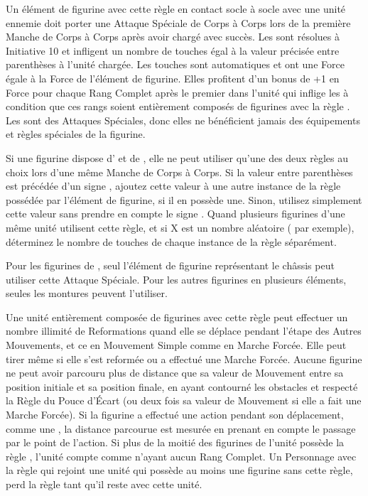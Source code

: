 \newpage
{}

Un élément de figurine avec cette règle en contact socle à socle avec une unité ennemie doit porter une Attaque Spéciale de Corps à Corps lors de la première Manche de Corps à Corps après avoir chargé avec succès. Les \impacthits{} sont résolues à Initiative 10 et infligent un nombre de touches égal à la valeur précisée entre parenthèses à l'unité chargée. Les touches sont automatiques et ont une Force égale à la Force de l'élément de figurine. Elles profitent d'un bonus de +1 en Force pour chaque Rang Complet après le premier dans l'unité qui inflige les \impacthits{} à condition que ces rangs soient entièrement composés de figurines avec la règle \impacthits{}. Les \impacthits{} sont des Attaques Spéciales, donc elles ne bénéficient jamais des équipements et règles spéciales de la figurine.

Si une figurine dispose d'\grindingattacks{} et de \impacthits{}, elle ne peut utiliser qu'une des deux règles au choix lors d'une même Manche de Corps à Corps. Si la valeur entre parenthèses est précédée d'un signe \result{+}, ajoutez cette valeur à une autre instance de la règle \impacthits{} possédée par l'élément de figurine, si il en possède une. Sinon, utilisez simplement cette valeur sans prendre en compte le signe \result{+}. Quand plusieurs figurines d'une même unité utilisent cette règle, et si X est un nombre aléatoire ( par exemple), déterminez le nombre de touches de chaque instance de la règle séparément.

Pour les figurines de \chariot{}, seul l'élément de figurine représentant le châssis peut utiliser cette Attaque Spéciale. Pour les autres figurines en plusieurs éléments, seules les montures peuvent l'utiliser.


Une unité entièrement composée de figurines avec cette règle peut effectuer un nombre illimité de Reformations quand elle se déplace pendant l'étape des Autres Mouvements, et ce en Mouvement Simple comme en Marche Forcée. Elle peut tirer même si elle s'est reformée ou a effectué une Marche Forcée. Aucune figurine ne peut avoir parcouru plus de distance que sa valeur de Mouvement entre sa position initiale et sa position finale, en ayant contourné les obstacles et respecté la Règle du Pouce d'Écart (ou deux fois sa valeur de Mouvement si elle a fait une Marche Forcée). Si la figurine a effectué une action pendant son déplacement, comme une \sweepingattack{}, la distance parcourue est mesurée en prenant en compte le passage par le point de l'action. Si plus de la moitié des figurines de l'unité possède la règle \lighttroops{}, l'unité compte comme n'ayant aucun Rang Complet. Un Personnage avec la règle \lighttroops{} qui rejoint une unité qui possède au moins une figurine sans cette règle, perd la règle \lighttroops{} tant qu'il reste avec cette unité.

